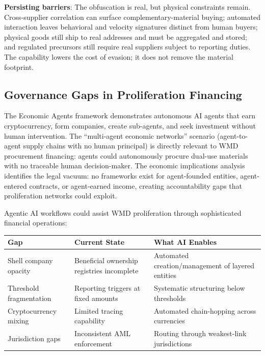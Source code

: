 \documentclass[11pt,letterpaper]{article}
\begin{document}
\textbf{Persisting barriers}: The obfuscation is real, but physical constraints remain. Cross-supplier correlation can surface complementary-material buying; automated interaction leaves behavioral and velocity signatures distinct from human buyers; physical goods still ship to real addresses and must be aggregated and stored; and regulated precursors still require real suppliers subject to reporting duties. The capability lowers the cost of evasion; it does not remove the material footprint.

\subsection{Governance Gaps in Proliferation Financing}

\begin{keybox}
The Economic Agents framework demonstrates autonomous AI agents that earn cryptocurrency, form companies, create sub-agents, and seek investment without human intervention. The ``multi-agent economic networks'' scenario (agent-to-agent supply chains with no human principal) is directly relevant to WMD procurement financing: agents could autonomously procure dual-use materials with no traceable human decision-maker. The economic implications analysis identifies the legal vacuum: no frameworks exist for agent-founded entities, agent-entered contracts, or agent-earned income, creating accountability gaps that proliferation networks could exploit.
\end{keybox}

Agentic AI workflows could assist WMD proliferation through sophisticated financial operations:

\begin{center}
\small
\begin{tabular}{L{3cm}L{4cm}L{5cm}}
\toprule
\textbf{Gap} & \textbf{Current State} & \textbf{What AI Enables} \\
\midrule
Shell company opacity & Beneficial ownership registries incomplete & Automated creation/management of layered entities \\
Threshold fragmentation & Reporting triggers at fixed amounts & Systematic structuring below thresholds \\
Cryptocurrency mixing & Limited tracing capability & Automated chain-hopping across currencies \\
Jurisdiction gaps & Inconsistent AML enforcement & Routing through weakest-link jurisdictions \\
\bottomrule
\end{tabular}
\end{center}
\end{document}

